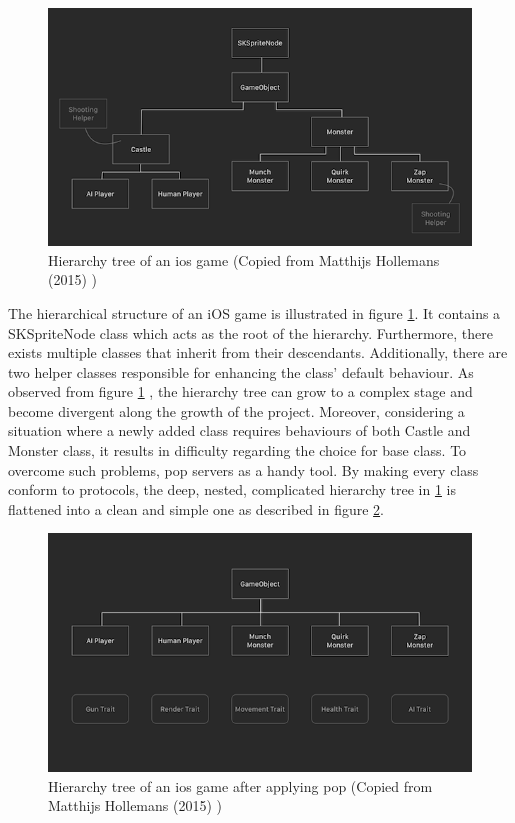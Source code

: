 \documentclass[11pt,a4paper,oneside,article]{memoir}
\begin{document}
\begin{figure}[H]
\centering
\includegraphics[width=\textwidth]{beforePop}

\caption{Hierarchy tree of an \gls{ios} game (Copied from Matthijs Hollemans (2015) \cite{machinethink:pattern})}
\label{fig:beforePop}
\end{figure}

The hierarchical structure of an iOS game is illustrated in figure \ref{fig:beforePop}. It contains a SKSpriteNode class which acts as the root of the hierarchy. Furthermore, there exists multiple classes that inherit from their descendants. Additionally, there are two helper classes responsible for enhancing the class' default behaviour. As observed from figure \ref{fig:beforePop} %
, the hierarchy tree can grow to a complex stage and become divergent along the growth of the project. Moreover, considering a situation where a newly added class requires behaviours of both Castle and Monster class, it results in  difficulty regarding the choice for base class. To overcome such problems, \gls{pop} servers as a handy tool. By making every class conform to protocols, the deep, nested, complicated hierarchy tree in \ref{fig:beforePop} is flattened into a clean and simple one as described in figure \ref{fig:afterPop}. %

\iftrue
\begin{figure}[H]

\centering
\includegraphics[width=\textwidth]{afterPop}

\caption{Hierarchy tree of an \gls{ios} game after applying \gls{pop} (Copied from Matthijs Hollemans (2015) \cite{machinethink:pattern})}
\label{fig:afterPop}

\end{figure}
\fi
\end{document}
